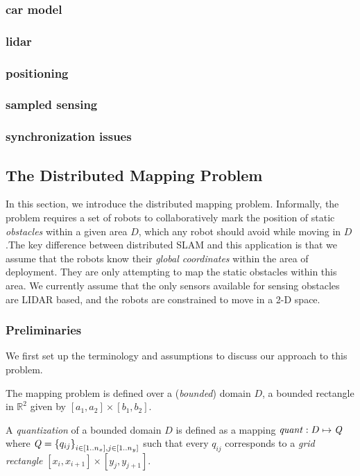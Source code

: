 \subsubsection{car model}
\subsubsection{lidar}
\subsubsection{positioning}
\subsubsection{sampled sensing}
\subsubsection{synchronization issues}
 
\subsection{The Distributed Mapping Problem}
In this section, we introduce the distributed mapping problem. Informally, the problem requires a set of robots to collaboratively mark the position of static \emph{obstacles} within a given area $D$, which any robot should avoid while moving in $D$.The key difference between distributed SLAM and this application is that we assume that the robots know their \emph{global coordinates} within the area of deployment. They are only attempting to map the static obstacles within this area. We currently assume that the only sensors available for sensing obstacles are LIDAR based, and the robots are constrained to move in a 2-D space.


\subsubsection{Preliminaries}
\label{sec:prelims}
We first set up the terminology and assumptions to discuss our approach to this problem. 

The mapping problem is defined over a (\emph{bounded}) domain $D$, a bounded rectangle in $\mathbb{R}^2$ given by $[a_1,a_2]\times [b_1,b_2]$.

\begin{definition}
A \emph{quantization} of a bounded domain $D$ is defined as a mapping $\mathit{quant}:D \mapsto \mathit{Q}$ where $\mathit{Q} = \left\{q_{ij}\right\}_{i\in [1..n_x], j\in [1..n_y]}$ such that every $q_{ij}$ corresponds to a \emph{grid rectangle} $[x_i, x_{i+1}] \times [y_j, y_{j+1}]$.
\end{definition}

